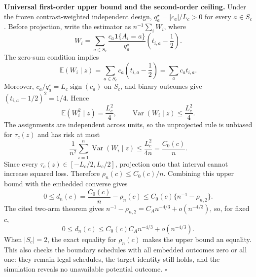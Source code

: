 \textbf{Universal first-order upper bound and the second-order ceiling.}
Under the frozen contrast-weighted independent design, \(q_a^\star=|c_a|/L_c>0\) for every \(a\in S_c\). Before projection, write the estimator as \(n^{-1}\sum_i W_i\), where
\[
 W_i=\sum_{a\in S_c}
 \frac{c_a\mathbf 1\{A_i=a\}}{q_a^\star}
 \left(t_{i,a}-\frac12\right).
\]
The zero-sum condition implies
\[
 \mathbb E(W_i\mid z)
 =\sum_{a\in S_c}c_a\left(t_{i,a}-\frac12\right)
 =\sum_a c_at_{i,a}.
\]
Moreover, \(c_a/q_a^\star=L_c\operatorname{sign}(c_a)\) on \(S_c\), and binary outcomes give \((t_{i,a}-1/2)^2=1/4\). Hence
\[
 \mathbb E(W_i^2\mid z)=\frac{L_c^2}{4},
 \qquad
 \operatorname{Var}(W_i\mid z)\leq\frac{L_c^2}{4}.
\]
The assignments are independent across units, so the unprojected rule is unbiased for \(\tau_c(z)\) and has risk at most
\[
 \frac1{n^2}\sum_{i=1}^n\operatorname{Var}(W_i\mid z)
 \leq\frac{L_c^2}{4n}=\frac{C_0(c)}n.
\]
Since every \(\tau_c(z)\in[-L_c/2,L_c/2]\), projection onto that interval cannot increase squared loss. Therefore \(\rho_n(c)\leq C_0(c)/n\). Combining this upper bound with the embedded converse gives
\[
 0\leq d_n(c)=\frac{C_0(c)}n-\rho_n(c)
 \leq C_0(c)\{n^{-1}-\rho_{n,2}\}.
\]
The cited two-arm theorem gives
\(n^{-1}-\rho_{n,2}=C_A n^{-4/3}+o(n^{-4/3})\), so, for fixed \(c\),
\[
 0\leq d_n(c)
 \leq C_0(c)C_A n^{-4/3}+o(n^{-4/3}).
\]
When \(|S_c|=2\), the exact equality for \(\rho_n(c)\) makes the upper bound an equality. This also checks the boundary schedules with all embedded outcomes zero or all one: they remain legal schedules, the target identity still holds, and the simulation reveals no unavailable potential outcome. \(\square\)